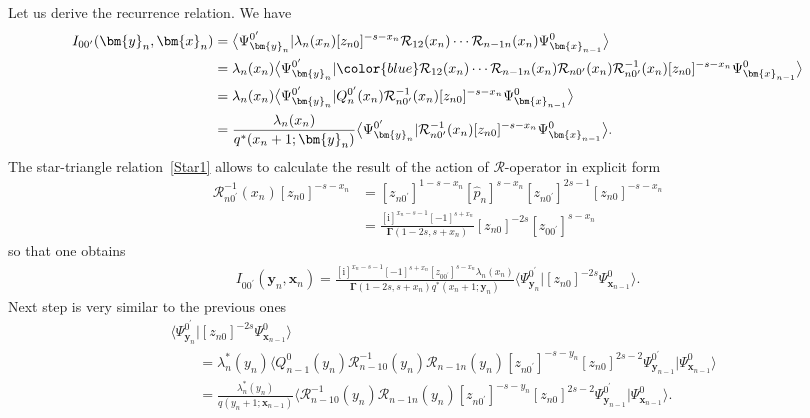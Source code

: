 \documentclass[pdftex]{sigma}
\newcommand{\blue}{\color{blue}}
\renewcommand{\imath}{\mathrm{i}}
\numberwithin{equation}{section}
\begin{document}
Let us derive the recurrence relation. We have
\begin{align*}
I_{0 0^{\prime}}(\bm{y}_n,\bm{x}_{n}) & =
\bigl\langle\Psi^{0^{\prime}}_{\bm{y}_n}|
\lambda_n(x_n) [z_{n0}]^{-s-x_n} \mathcal{R}_{12}(x_n)\cdots\mathcal{R}_{n-1 n}(x_n)
\Psi^{0}_{\bm{x}_{n-1}}\bigr\rangle \\
& =
\lambda_n(x_n) \bigl\langle\Psi^{0^{\prime}}_{\bm{y}_n}|
{\blue \mathcal{R}_{12}(x_n)\cdots\mathcal{R}_{n-1 n}(x_n)
\mathcal{R}_{n 0^{\prime}}(x_n)}
\mathcal{R}^{-1}_{n 0^{\prime}}(x_n) [z_{n0}]^{-s-x_n}
\Psi^{0}_{\bm{x}_{n-1}}\bigr\rangle \\
& =
\lambda_n(x_n) \bigl\langle\Psi^{0^{\prime}}_{\bm{y}_n}|
Q^{0^{\prime}}_{n}(x_n)
\mathcal{R}^{-1}_{n 0^{\prime}}(x_n) [z_{n0}]^{-s-x_n}
\Psi^{0}_{\bm{x}_{n-1}}\bigr\rangle \\
& =
\frac{\lambda_n(x_n) }{q^{*}(x_n+1;\bm{y}_n)}
\bigl\langle\Psi^{0^{\prime}}_{\bm{y}_n}|
\mathcal{R}^{-1}_{n 0^{\prime}}(x_n) [z_{n0}]^{-s-x_n}
\Psi^{0}_{\bm{x}_{n-1}}\bigr\rangle .
\end{align*}
The star-triangle relation~\eqref{Star1} allows to
calculate the result of the action of $\mathcal{R}$-operator
in explicit form
\begin{align*}
\mathcal{R}^{-1}_{n 0^{\prime}}(x_n) [z_{n0}]^{-s-x_n} & =
[z_{n0^{\prime}}]^{1-s-x_n} [\hat{p}_n]^{s-x_n}
[z_{n0^{\prime}}]^{2s-1} [z_{n0}]^{-s-x_n} \\
& =
\frac{[\imath]^{x_n-s-1} [-1]^{s+x_n}}
{\mathbf{\Gamma}(1-2s,s+x_n)} [z_{n0}]^{-2s}
[z_{0 0^{\prime}}]^{s-x_n}
\end{align*}
so that one obtains
\begin{align*}
I_{0 0^{\prime}}(\bm{y}_n,\bm{x}_{n}) =
\frac{[\imath]^{x_n-s-1} [-1]^{s+x_n} [z_{0 0^{\prime}}]^{s-x_n} \lambda_n(x_n)}
{\mathbf{\Gamma}(1-2s,s+x_n) q^{*}(x_n+1;\bm{y}_n)}
\bigl\langle\Psi^{0^{\prime}}_{\bm{y}_n}| [z_{n0}]^{-2s}
\Psi^{0}_{\bm{x}_{n-1}}\bigr\rangle .
\end{align*}
Next step is very similar to the previous ones
\begin{align*}
&
\bigl\langle\Psi^{0^{\prime}}_{\bm{y}_n}| [z_{n0}]^{-2s}
\Psi^{0}_{\bm{x}_{n-1}}\bigr\rangle \\
& \qquad =
\lambda_n^\ast(y_n) \bigl\langle Q^{0}_{n-1}(y_n)
\mathcal{R}^{-1}_{n-1 0}(y_n)
\mathcal{R}_{n-1 n}(y_n)
[z_{n 0^{\prime}}]^{-s-y_n} [z_{n0}]^{2s-2}
\Psi^{0^{\prime}}_{\bm{y}_{n-1}}| \Psi^{0}_{\bm{x}_{n-1}}\bigr\rangle \\
& \qquad =
\frac{\lambda_n^\ast(y_n)}{q(y_n+1;\bm{x}_{n-1})} \bigl\langle \mathcal{R}^{-1}_{n-1 0}(y_n)
\mathcal{R}_{n-1 n}(y_n)
[z_{n 0^{\prime}}]^{-s-y_n} [z_{n0}]^{2s-2}
\Psi^{0^{\prime}}_{\bm{y}_{n-1}}| \Psi^{0}_{\bm{x}_{n-1}}\bigr\rangle .
\end{align*}
\end{document}
